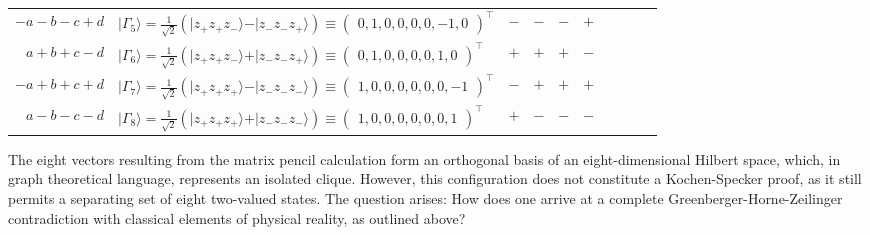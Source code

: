\documentclass[
  twocolumn,
 showpacs,
 showkeys,
 preprintnumbers,
 amsmath,amssymb,
 aps,
 prl,
  longbibliography,
 floatfix,
 ]{revtex4-2}
\begin{document}
\begin{table*}[ht]
\begin{ruledtabular}
\begin{tabular}{rlcccccccc}
   $-a - b - c + d $ &          $ \vert \Gamma_5 \rangle = \frac{1}{\sqrt{2}}\left( \vert z_+z_+z_- \rangle  - \vert z_-z_-z_+ \rangle \right) \equiv \begin{pmatrix}          0, 1, 0, 0, 0, 0, -1, 0            \end{pmatrix}^\intercal  $  &   $\boldsymbol{-}$ &  $\boldsymbol{-}$  & $\boldsymbol{-}$   & $\boldsymbol{+}$        \\
   $  a + b + c - d$  &         $ \vert \Gamma_6 \rangle = \frac{1}{\sqrt{2}}\left( \vert z_+z_+z_- \rangle  + \vert z_-z_-z_+ \rangle \right) \equiv \begin{pmatrix}          0, 1, 0, 0, 0, 0,   1, 0            \end{pmatrix}^\intercal $  &   $\boldsymbol{+}$ &  $\boldsymbol{+}$  & $\boldsymbol{+}$   & $\boldsymbol{-}$         \\
   $-a + b + c + d $&           $ \vert \Gamma_7 \rangle = \frac{1}{\sqrt{2}}\left( \vert z_+z_+z_+ \rangle  - \vert z_-z_-z_- \rangle \right) \equiv \begin{pmatrix}          1, 0, 0, 0, 0, 0, 0, -1            \end{pmatrix}^\intercal  $  &   $\boldsymbol{-}$ &  $\boldsymbol{+}$  & $\boldsymbol{+}$   & $\boldsymbol{+}$     \\
   $a - b - c - d  $&           $ \vert \Gamma_8 \rangle = \frac{1}{\sqrt{2}}\left( \vert z_+z_+z_+ \rangle  + \vert z_-z_-z_- \rangle \right) \equiv \begin{pmatrix}          1, 0, 0, 0, 0, 0, 0, 1            \end{pmatrix}^\intercal   $  &   $\boldsymbol{+}$ &  $\boldsymbol{-}$  & $\boldsymbol{-}$   & $\boldsymbol{-}$       \\
\end{tabular}
\end{ruledtabular}
\end{table*}

The eight vectors resulting from the matrix pencil calculation form an orthogonal basis of an eight-dimensional Hilbert space, which,
in graph theoretical language, represents an isolated clique.
However, this configuration does not constitute a Kochen-Specker proof, as it still permits a separating set of eight two-valued states.
The question arises: How does one arrive at a complete Greenberger-Horne-Zeilinger contradiction with classical elements of physical reality, as outlined above?
\end{document}
